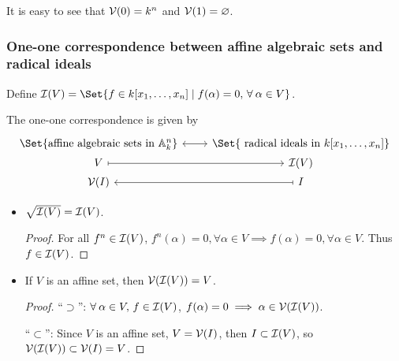 \begin{example}
  It is easy to see that $\mathcal{V}(0) = k^n$ and $\mathcal{V}(1) = \varnothing$.
\end{example}

\subsubsection{One-one correspondence between affine algebraic sets and radical ideals}

\begin{definition}
  Define $\Ic(V) = \Set{ f \in k[x_1, \dots, x_n] \mid f(\alpha) = 0, \, \forall \alpha \in V}$.
\end{definition}

The one-one correspondence is given by
  \[
    \begin{tikzcd}[column sep=0.8cm,row sep=0ex]
      \Set{ \text{affine algebraic sets in } \Ab^n_k }
      \arrow[r, leftrightarrow] & \Set{ \text{ radical ideals in } k[x_1, \dots, x_n]} \\
      V \arrow[r, mapsto] & \Ic(V) \\
      \Vc(I) \arrow[r, mapsfrom] & I
    \end{tikzcd}
  \]

\begin{prop} \hfill
\begin{itemize}
  \item $\sqrt{\mathcal{I}(V)} = \mathcal{I}(V)$.
    \begin{proof}
      For all $f^n \in \mathcal{I}(V)$,
      $f^n(\alpha) = 0, \forall \alpha \in V \implies f(\alpha) = 0, \forall \alpha \in V$.
      Thus $f \in \mathcal{I}(V)$.
    \end{proof}
  \item If $V$ is an affine set, then $\mathcal{V}(\mathcal{I}(V)) = V$.
    \begin{proof}
      ``$\supset$'': $\forall \alpha \in V,\, f \in \Ic(V)$, $f(\alpha) = 0 \implies \alpha \in \mathcal{V}(\mathcal{I}(V))$.

      ``$\subset$'': Since $V$ is an affine set, $V = \mathcal{V}(I)$, then $I \subset \mathcal{I}(V)$,
      so $\mathcal{V}(\mathcal{I}(V)) \subset \mathcal{V}(I) = V$.
    \end{proof}
\end{itemize}
\end{prop}

